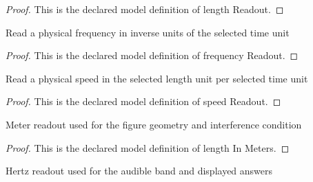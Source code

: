 \begin{proof}
  This is the declared model definition of length Readout.
\end{proof}
\begin{definition}
  \label{def:physics:phyx-mini-0314:phyxminiproblems-problemphyxmini0314-frequencyreadout}
  Read a physical frequency in inverse units of the selected time unit
\end{definition}
\begin{proof}
  This is the declared model definition of frequency Readout.
\end{proof}
\begin{definition}
  \label{def:physics:phyx-mini-0314:phyxminiproblems-problemphyxmini0314-speedreadout}
  Read a physical speed in the selected length unit per selected time unit
\end{definition}
\begin{proof}
  This is the declared model definition of speed Readout.
\end{proof}
\begin{definition}
  \label{def:physics:phyx-mini-0314:phyxminiproblems-problemphyxmini0314-lengthinmeters}
  Meter readout used for the figure geometry and interference condition
\end{definition}
\begin{proof}
  This is the declared model definition of length In Meters.
\end{proof}
\begin{definition}
  \label{def:physics:phyx-mini-0314:phyxminiproblems-problemphyxmini0314-frequencyinhertz}
  Hertz readout used for the audible band and displayed answers
\end{definition}
